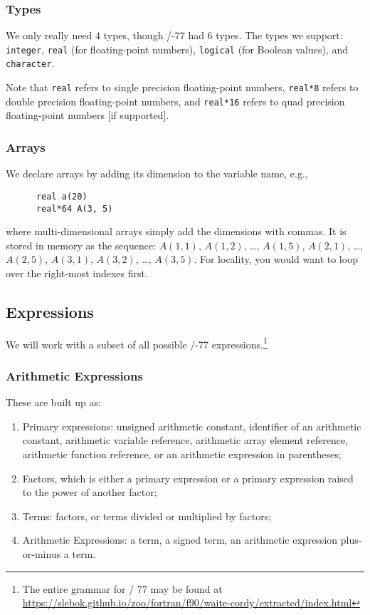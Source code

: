 \subsubsection{Types}
We only really need 4 types, though \FORTRAN/-77 had 6 types. The types
we support: \texttt{integer}, \texttt{real} (for floating-point
numbers), \texttt{logical} (for Boolean values), and \texttt{character}.

Note that \texttt{real} refers to single precision floating-point
numbers, \texttt{real*8} refers to double precision floating-point
numbers, and \texttt{real*16} refers to quad precision floating-point
numbers [if supported].

\subsubsection{Arrays}
We declare arrays by adding its dimension to the variable name, e.g.,
\begin{lstlisting}
      real a(20)
      real*64 A(3, 5)
\end{lstlisting}
where multi-dimensional arrays simply add the dimensions with commas. It
is stored in memory as the sequence: $A(1,1)$, $A(1,2)$, \dots,
$A(1,5)$, $A(2,1)$, \dots, $A(2,5)$, $A(3,1)$, $A(3,2)$, \dots, $A(3,5)$.
For locality, you would want to loop over the right-most indexes first.

\subsection{Expressions}
We will work with a subset of all possible \FORTRAN/-77
expressions.\footnote{The entire grammar for \FORTRAN/ 77 may be found
at \url{https://slebok.github.io/zoo/fortran/f90/waite-cordy/extracted/index.html}}

\subsubsection{Arithmetic Expressions}
These are built up as:
\begin{enumerate}
\item Primary expressions: unsigned arithmetic constant, identifier of
  an arithmetic constant, arithmetic variable reference, arithmetic
  array element reference, arithmetic function reference, or an
  arithmetic expression in parentheses;
\item Factors, which is either a primary expression or a primary
  expression raised to the power of another factor;
\item Terms: factors, or terms divided or multiplied by factors; 
\item Arithmetic Expressions: a term, a signed term, an arithmetic
  expression plus-or-minus a term.
\end{enumerate}

